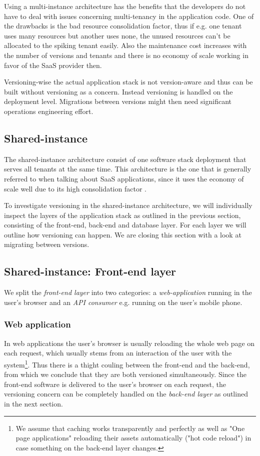 Using a multi-instance architecture has the benefits that the developers do not have to deal with issues concerning multi-tenancy in the application code. One of the drawbacks is the bad resource consolidation factor, thus if e.g. one tenant uses many resources but another uses none, the unused resources can't be allocated to the spiking tenant easily. Also the maintenance cost increases with the number of versions and tenants and there is no economy of scale working in favor of the SaaS provider then.

Versioning-wise the actual application stack is not version-aware and thus can be built without versioning as a concern. Instead versioning is handled on the deployment level. Migrations between versions might then need significant operations engineering effort.

\subsection{Shared-instance}

The shared-instance architecture consist of one software stack deployment that serves all tenants at the same time. This architecture is the one that is generally referred to when talking about SaaS applications, since it uses the economy of scale well due to its high consolidation factor \cite{Mietzner2009} \cite{Bezemer2010} \cite{Chong2006}.

To investigate versioning in the shared-instance architecture, we will individually inspect the layers of the application stack as outlined in the previous section, consisting of the front-end, back-end and database layer. For each layer we will outline how versioning can happen. We are closing this section with a look at migrating between versions.

\subsection{Shared-instance: Front-end layer}
\label{sec:sharedfrontend}

We split the \emph{front-end layer} into two categories: a \emph{web-application} running in the user's browser and an \emph{API consumer} e.g. running on the user's mobile phone.

\subsubsection{Web application} In web applications the user's browser is usually reloading the whole web page on each request, which usually stems from an interaction of the user with the system\footnote{We assume that caching works transparently and perfectly as well as "One page applications" reloading their assets automatically ("hot code reload") in case something on the back-end layer changes.}. Thus there is a thight couling between the front-end and the back-end, from which we conclude that they are both versioned simultaneously. Since the front-end software is delivered to the user's browser on each request, the versioning concern can be completely handled on the \emph{back-end layer} as outlined in the next section.

